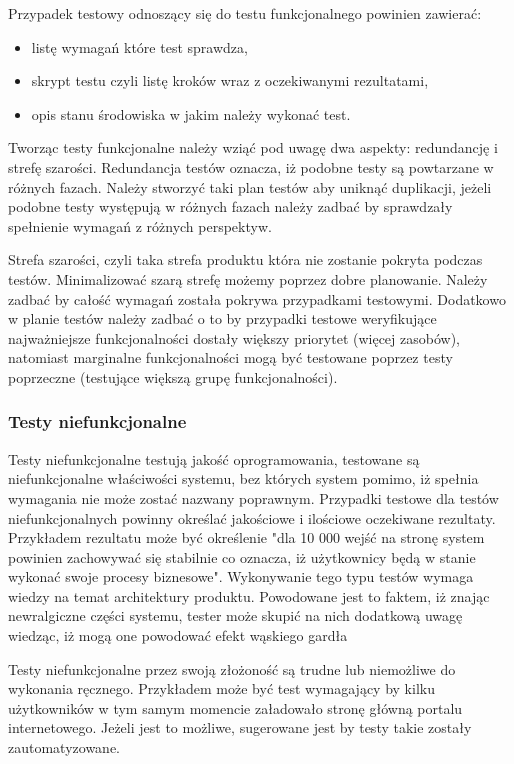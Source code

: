 Przypadek testowy odnoszący się do testu funkcjonalnego powinien zawierać:
\begin{itemize}
  \item  listę wymagań które test sprawdza,
  \item skrypt testu czyli listę kroków wraz z oczekiwanymi rezultatami,
  \item opis stanu środowiska w jakim należy wykonać test.
\end{itemize}

Tworząc testy funkcjonalne należy wziąć pod uwagę dwa aspekty: redundancję i strefę szarości. Redundancja testów oznacza, iż podobne testy są powtarzane w różnych fazach. Należy stworzyć taki plan testów aby uniknąć duplikacji, jeżeli podobne testy występują w różnych fazach należy zadbać by sprawdzały spełnienie wymagań z różnych perspektyw. 

Strefa szarości, czyli taka strefa produktu która nie zostanie pokryta podczas testów. Minimalizować szarą strefę możemy poprzez dobre planowanie. Należy zadbać by całość wymagań została pokrywa przypadkami testowymi. Dodatkowo w planie testów należy zadbać o to by przypadki testowe weryfikujące najważniejsze funkcjonalności dostały większy priorytet (więcej zasobów), natomiast marginalne funkcjonalności mogą być testowane poprzez testy poprzeczne (testujące większą grupę funkcjonalności).
\subsubsection{Testy niefunkcjonalne}
Testy niefunkcjonalne testują jakość oprogramowania, testowane są  niefunkcjonalne właściwości systemu, bez których system pomimo, iż spełnia wymagania nie może zostać nazwany poprawnym. Przypadki testowe dla testów niefunkcjonalnych powinny określać jakościowe i ilościowe oczekiwane rezultaty. Przykładem rezultatu może być określenie "dla 10 000 wejść na stronę system powinien zachowywać się stabilnie co oznacza, iż użytkownicy będą w stanie wykonać swoje procesy biznesowe". Wykonywanie tego typu testów wymaga wiedzy na temat architektury produktu. Powodowane jest to faktem, iż znając newralgiczne części systemu, tester może skupić na nich dodatkową uwagę wiedząc, iż mogą one powodować efekt wąskiego gardła


Testy niefunkcjonalne przez swoją złożoność są trudne lub niemożliwe do wykonania ręcznego. Przykładem może być test wymagający by kilku użytkowników w tym samym momencie załadowało stronę główną portalu internetowego. Jeżeli jest to możliwe, sugerowane jest by testy takie zostały zautomatyzowane.
